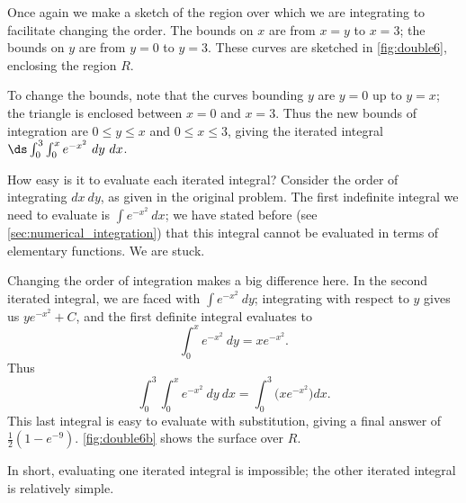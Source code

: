 {Once again we make a sketch of the region over which we are integrating to facilitate changing the order. The bounds on $x$ are from $x=y$ to $x=3$; the bounds on $y$ are from $y=0$ to $y=3$. These curves are sketched in \autoref{fig:double6}, enclosing the region $R$.


To change the bounds, note that the curves bounding $y$ are $y=0$ up to $y=x$; the triangle is enclosed between $x=0$ and $x=3$. Thus the new bounds of integration are $0\leq y\leq x$ and $0\leq x\leq 3$, giving the iterated integral $\ds \int_0^3\int_0^x e^{-x^2}\ dy\ dx$.

How easy is it to evaluate each iterated integral? Consider the order of integrating $dx\ dy$, as given in the original problem. The first indefinite integral we need to evaluate is $\int e^{-x^2}\ dx$; we have stated before (see \autoref{sec:numerical_integration}) that this integral cannot be evaluated in terms of elementary functions. We are stuck.

Changing the order of integration makes a big difference here. In the second iterated integral, we are faced with $\int e^{-x^2}\ dy$; integrating with respect to $y$ gives us $ye^{-x^2}+C$, and the first definite integral evaluates to 
\[\int_0^x e^{-x^2}\ dy = xe^{-x^2}.\]
Thus 
\[\int_0^3\int_0^x e^{-x^2}\ dy\ dx = \int_0^3\Big(xe^{-x^2}\Big)dx.\]
This last integral is easy to evaluate with substitution, giving a final answer of $\frac12(1-e^{-9})%
$. \autoref{fig:double6b} shows the surface over $R$.

In short, evaluating one iterated integral is impossible; the other iterated integral is relatively simple.}

